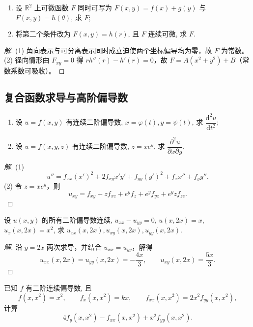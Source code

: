 \documentclass[../../数学分析培优讲义(答案版).tex]{subfiles}
\begin{document}
\begin{example}
\begin{enumerate}[label=(\arabic*)]
    \item 设 $\mathbb{R}^2$ 上可微函数 $F$ 同时可写为 $F(x,y)=f(x)+g(y)$ 与 $F(x,y)=h(\theta)$, 求 $F$;
    \item 将第二个条件改为 $F(x,y)=h(r)$, 且 $F$ 连续可微, 求 $F$.
\end{enumerate}
\end{example}

\begin{proof}[解]
(1) 角向表示与可分离表示同时成立迫使两个坐标偏导均为零，故 $F$ 为常数。(2) 径向情形由 $F_{xy}=0$ 得 $rh''(r)-h'(r)=0$，故 $F=A(x^2+y^2)+B$（常数系数可吸收）。
\end{proof}

\subsection{复合函数求导与高阶偏导数}

\begin{example}
\begin{enumerate}[label=(\arabic*)]
    \item 设 $u=f(x,y)$ 有连续二阶偏导数, $x=\varphi(t),y=\psi(t)$, 求 $\dfrac{\mathrm{d}^2u}{\mathrm{d}t^2}$;
    \item 设 $u=f(x,y,z)$ 有连续二阶偏导数, $z=xe^y$, 求 $\dfrac{\partial^2u}{\partial x\partial y}$.
\end{enumerate}
\end{example}

\begin{proof}[解]
(1)
\[
u''=f_{xx}(x')^2+2f_{xy}x'y'+f_{yy}(y')^2+f_xx''+f_yy''.
\]
(2) 令 $z=xe^y$，则
\[
u_{xy}=f_{xy}+zf_{xz}+e^yf_z+e^yf_{yz}+e^yzf_{zz}.
\]
\end{proof}

\begin{example}
设 $u(x,y)$ 的所有二阶偏导数连续, $u_{xx}-u_{yy}=0$, $u(x,2x)=x$, $u_x(x,2x)=x^2$, 求 $u_{xx}(x,2x),u_{xy}(x,2x),u_{yy}(x,2x)$.
\end{example}

\begin{proof}[解]
沿 $y=2x$ 两次求导，并结合 $u_{xx}=u_{yy}$，解得
\[
u_{xx}(x,2x)=u_{yy}(x,2x)=-\dfrac{4x}{3},\qquad
u_{xy}(x,2x)=\dfrac{5x}{3}.
\]
\end{proof}

\begin{example}
已知 $f$ 有二阶连续偏导数, 且
\[
    f(x,x^2)=x^2,\qquad f_x(x,x^2)=kx,\qquad f_{xx}(x,x^2)=2x^2f_{yy}(x,x^2),
\]
计算
\[
    4f_y(x,x^2)-f_{xx}(x,x^2)+x^2f_{yy}(x,x^2).
\]
\end{example}
\end{document}
